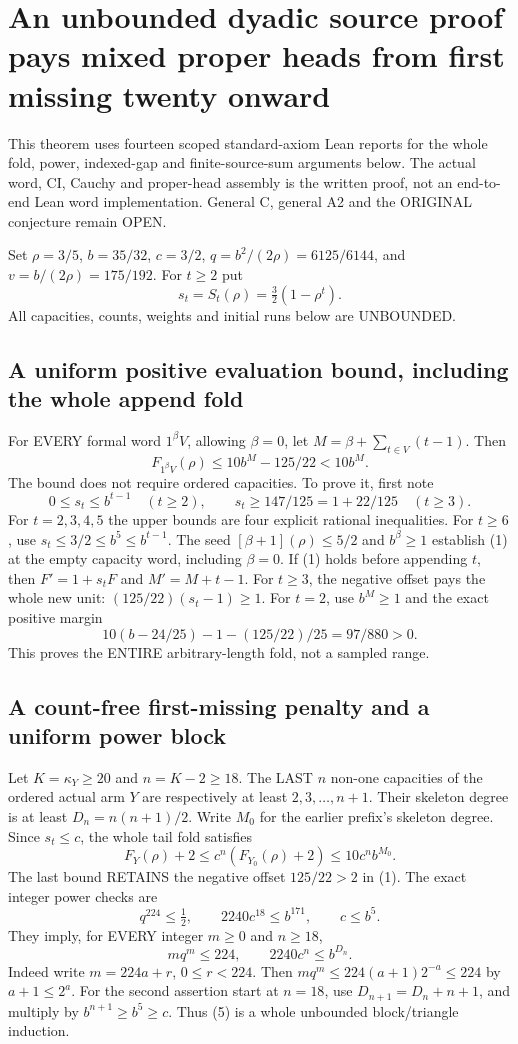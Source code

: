 \section{An unbounded dyadic source proof pays mixed proper heads from first missing twenty onward}
This theorem uses fourteen scoped standard-axiom Lean reports for the
whole fold, power, indexed-gap and finite-source-sum arguments below.
The actual word, CI, Cauchy and proper-head assembly is the written proof,
not an end-to-end Lean word implementation. General C, general A2 and
the ORIGINAL conjecture remain OPEN.

Set $\rho=3/5$, $b=35/32$, $c=3/2$, $q=b^2/(2\rho)=6125/6144$,
and $v=b/(2\rho)=175/192$. For $t\ge2$ put
\[
 s_t=S_t(\rho)=\tfrac32(1-\rho^t).
\]
All capacities, counts, weights and initial runs below are UNBOUNDED.

\subsection{A uniform positive evaluation bound, including the whole append fold}
For EVERY formal word $1^\beta V$, allowing $\beta=0$, let
$M=\beta+\sum_{t\in V}(t-1)$. Then
\[
                       F_{1^\beta V}(\rho)\le10b^M-125/22<10b^M. \tag{1}
\]
The bound does not require ordered capacities. To prove it, first note
\[
 0\le s_t\le b^{t-1}\quad(t\ge2),\qquad
 s_t\ge147/125=1+22/125\quad(t\ge3).                  \tag{2}
\]
For $t=2,3,4,5$ the upper bounds are four explicit rational inequalities.
For $t\ge6$, use $s_t\le3/2\le b^5\le b^{t-1}$.
The seed $[\beta+1](\rho)\le5/2$ and $b^\beta\ge1$ establish
(1) at the empty capacity word, including $\beta=0$.
If (1) holds before appending $t$, then $F'=1+s_tF$ and $M'=M+t-1$.
For $t\ge3$, the negative offset pays the whole new unit:
$(125/22)(s_t-1)\ge1$. For $t=2$, use $b^M\ge1$ and the exact
positive margin
\[
           10(b-24/25)-1-(125/22)/25=97/880>0.
\]
This proves the ENTIRE arbitrary-length fold, not a sampled range.

\subsection{A count-free first-missing penalty and a uniform power block}
Let $K=\kappa_Y\ge20$ and $n=K-2\ge18$. The LAST $n$ non-one
capacities of the ordered actual arm $Y$ are respectively at least
$2,3,\ldots,n+1$. Their skeleton degree is at least
$D_n=n(n+1)/2$. Write $M_0$ for the earlier prefix's skeleton degree.
Since $s_t\le c$, the whole tail fold satisfies
\[
 F_Y(\rho)+2\le c^n(F_{Y_0}(\rho)+2)
                  \le10c^n b^{M_0}.                  \tag{3}
\]
The last bound RETAINS the negative offset $125/22>2$ in (1).
The exact integer power checks are
\[
 q^{224}\le\tfrac12,\qquad
           2240c^{18}\le b^{171},\qquad c\le b^5.    \tag{4}
\]
They imply, for EVERY integer $m\ge0$ and $n\ge18$,
\[
                 m q^m\le224,\qquad2240c^n\le b^{D_n}. \tag{5}
\]
Indeed write $m=224a+r$, $0\le r<224$. Then
$m q^m\le224(a+1)2^{-a}\le224$ by $a+1\le2^a$.
For the second assertion start at $n=18$, use
$D_{n+1}=D_n+n+1$, and multiply by $b^{n+1}\ge b^5\ge c$.
Thus (5) is a whole unbounded block/triangle induction.

